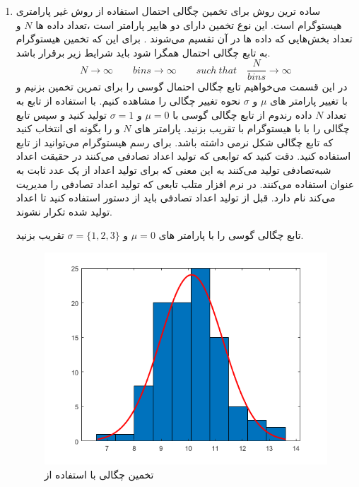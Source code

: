 \documentclass[14pt, professionalfont]{article}
\begin{document}
	
	\begin{enumerate}
		\item 
		ساده ترین روش برای تخمین چگالی احتمال استفاده از روش غیر پارامتری هیستوگرام است. این نوع تخمین دارای دو هایپر‌ پارامتر است ،‌تعداد داده ها
		\:
		$N$
		\:
		و تعداد بخش‌هایی که داده ها در آن تقسیم‌ می‌شوند
		\:
		\:
		. برای این که تخمین هیستوگرام به تابع چگالی احتمال همگرا شود باید شرایط زیر برقرار باشد.
		$$
		N \rightarrow \infty \qquad bins \rightarrow \infty \qquad such \: that \quad \frac{N}{bins} \rightarrow \infty
		$$
		در این قسمت می‌خواهیم تابع چگالی احتمال گوسی را برای تمرین تخمین بزنیم و با تغییر پارامتر های 
		\:
		$\mu$
		\:
		و 
		\: 
		$\sigma$
		\:
		نحوه تغییر چگالی را مشاهده کنیم. با استفاده از تابع 
		\:
		\:
		به تعداد 
		\:
		$N$
		\:
		داده رندوم از تابع چگالی گوسی با 
		\:
		$\mu = 0 $
		\:
		و 
		\:
		$\sigma = 1$
		\:
		تولید کنید و سپس تابع چگالی را با با هیستوگرام با 
		\:
		\:
		تقریب بزنید. پارامتر های 
			\:
		$N$
		\:
		و
		\:
		\:
		را بگونه ای انتخاب کنید که تابع چگالی شکل نرمی داشته باشد. برای رسم هیستوگرام می‌توانید از تابع
			\:
		\:
		استفاده کنید. دقت کنید که توابعی که تولید اعداد تصادفی می‌کنند در حقیقت اعداد شبه‌تصادفی تولید می‌کنند به این معنی که برای تولید اعداد از یک عدد ثابت به عنوان 
		\:
		\:
		استفاده می‌کنند. در نرم افزار متلب تابعی که تولید اعداد تصادفی را مدیریت می‌کند 
		\:
		\:
		نام دارد. قبل از تولید اعداد تصادفی باید از دستور 
		\:
		\:
		استفاده کنید تا اعداد تولید شده تکرار نشوند.
		
		تابع چگالی گوسی را با پارامتر های 
		\:
		$\mu = 0$
		\:
		و 
		\:
		$\sigma = \{1,2,3\}$
		\:
		تقریب بزنید. 
		
	
		
		
				\begin{figure}[h]
				\centering
				\includegraphics[scale = 0.25]{../images/hist.png}
				\caption{
					تخمین چگالی با استفاده از 
				}
			\end{figure}
		

\end{enumerate}
\end{document}
